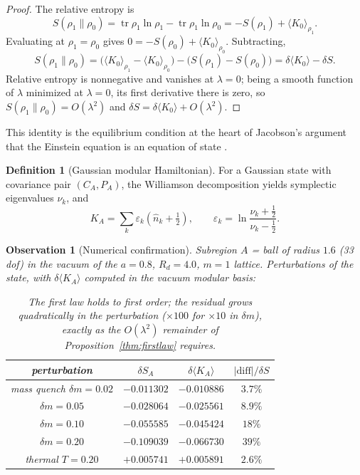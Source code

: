 \documentclass[11pt,a4paper]{article}
\newtheorem{observation}{Observation}
\theoremstyle{definition}
\newtheorem{definition}{Definition}
\theoremstyle{remark}
\begin{document}
\begin{proof}
The relative entropy is
\[
S(\rho_1\|\rho_0)
= \operatorname{tr}\rho_1\ln\rho_1 - \operatorname{tr}\rho_1\ln\rho_0
= -S(\rho_1) + \langle K_0\rangle_{\rho_1}.
\]
Evaluating at $\rho_1 = \rho_0$ gives
$0 = -S(\rho_0) + \langle K_0\rangle_{\rho_0}$. Subtracting,
\[
S(\rho_1\|\rho_0)
= \big(\langle K_0\rangle_{\rho_1} - \langle K_0\rangle_{\rho_0}\big)
- \big(S(\rho_1) - S(\rho_0)\big)
= \delta\langle K_0\rangle - \delta S.
\]
Relative entropy is nonnegative and vanishes at $\lambda = 0$; being a
smooth function of $\lambda$ minimized at $\lambda = 0$, its first derivative
there is zero, so $S(\rho_1\|\rho_0) = O(\lambda^2)$ and
$\delta S = \delta\langle K_0\rangle + O(\lambda^2)$.
\end{proof}

\noindent
This identity is the equilibrium condition at the heart of Jacobson's
argument that the Einstein equation is an equation of state
\cite{Jacobson1995,Jacobson2016}.

\begin{definition}[Gaussian modular Hamiltonian]
For a Gaussian state with covariance pair $(C_A, P_A)$, the Williamson
decomposition yields symplectic eigenvalues $\nu_k$, and
\begin{equation}
K_A = \sum_k \varepsilon_k\left(\hat n_k + \tfrac12\right),
\qquad
\varepsilon_k = \ln\frac{\nu_k + \tfrac12}{\nu_k - \tfrac12}.
\end{equation}
\end{definition}

\begin{observation}[Numerical confirmation]
Subregion $A$ = ball of radius $1.6$ (33 dof) in the vacuum of the
$a = 0.8$, $R_d = 4.0$, $m = 1$ lattice. Perturbations of the state, with
$\delta\langle K_A\rangle$ computed in the vacuum modular basis:
\begin{table}[h]
\centering
\begin{tabular}{cccc}
\toprule
perturbation & $\delta S_A$ & $\delta\langle K_A\rangle$ &
$|\mathrm{diff}|/\delta S$ \\
\midrule
mass quench $\delta m = 0.02$ & $-0.011302$ & $-0.010886$ & $3.7\%$ \\
\phantom{mass quench} $\delta m = 0.05$ & $-0.028064$ & $-0.025561$ & $8.9\%$ \\
\phantom{mass quench} $\delta m = 0.10$ & $-0.055585$ & $-0.045424$ & $18\%$ \\
\phantom{mass quench} $\delta m = 0.20$ & $-0.109039$ & $-0.066730$ & $39\%$ \\
thermal $T = 0.20$ & $+0.005741$ & $+0.005891$ & $2.6\%$ \\
\bottomrule
\end{tabular}
\caption{The first law holds to first order; the residual grows
\emph{quadratically} in the perturbation ($\times 100$ for $\times 10$ in
$\delta m$), exactly as the $O(\lambda^2)$ remainder of
Proposition~\ref{thm:firstlaw} requires.}
\label{tab:firstlaw}
\end{table}
\end{observation}
\end{document}
